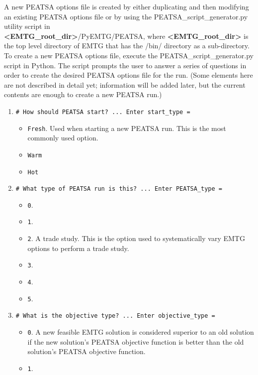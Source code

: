 \noindent A new \ac{PEATSA} options file is created by either duplicating and then modifying an existing \ac{PEATSA} options file or by using the PEATSA\_script\_generator.py utility script in \\ \textbf{\textless EMTG\_root\_dir\textgreater}/PyEMTG/PEATSA, where \textbf{\textless EMTG\_root\_dir\textgreater} is the top level directory of EMTG that has the /bin/ directory as a sub-directory. To create a new \ac{PEATSA} options file, execute the PEATSA\_script\_generator.py script in Python. The script prompts the user to answer a series of questions in order to create the desired \ac{PEATSA} options file for the run. (Some elements here are not described in detail yet; information will be added later, but the current contents are enough to create a new \ac{PEATSA} run.)

\begin{enumerate}
	\item \texttt{\# How should PEATSA start? ... Enter start\_type = }
	\begin{itemize}
		\item \texttt{Fresh}. Used when starting a new \ac{PEATSA} run. This is the most commonly used option.
		\item \texttt{Warm}
		\item \texttt{Hot}
	\end{itemize}
	\item \texttt{\# What type of PEATSA run is this? ... Enter PEATSA\_type = }
	\begin{itemize}
		\item \texttt{0}.
		\item \texttt{1}.
		\item \texttt{2}. A trade study. This is the option used to systematically vary \ac{EMTG} options to perform a trade study.
		\item \texttt{3}.
		\item \texttt{4}.
		\item \texttt{5}.
	\end{itemize}
	\item \texttt{\# What is the objective type? ... Enter objective\_type = }
	\begin{itemize}
		\item \texttt{0}. A new feasible \ac{EMTG} solution is considered superior to an old solution if the new solution's \ac{PEATSA} objective function is better than the old solution's \ac{PEATSA} objective function.
		\item \texttt{1}.
	\end{itemize}

\end{enumerate}
